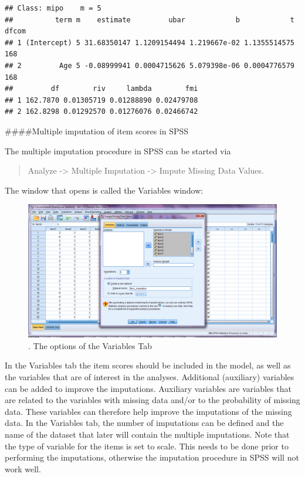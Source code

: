 \documentclass[
]{book}
\begin{document}
\begin{verbatim}
## Class: mipo    m = 5 
##          term m    estimate         ubar            b            t dfcom
## 1 (Intercept) 5 31.68350147 1.1209154494 1.219667e-02 1.1355514575   168
## 2         Age 5 -0.08999941 0.0004715626 5.079398e-06 0.0004776579   168
##         df        riv     lambda        fmi
## 1 162.7870 0.01305719 0.01288890 0.02479708
## 2 162.8298 0.01292570 0.01276076 0.02466742
\end{verbatim}

\#\#\#\#Multiple imputation of item scores in SPSS

The multiple imputation procedure in SPSS can be started via

\begin{quote}
Analyze -\textgreater{} Multiple Imputation -\textgreater{} Impute Missing Data Values.
\end{quote}

The window that opens is called the Variables window:

\begin{figure}

{\centering \includegraphics[width=0.9\linewidth]{images/fig8.1} 

}

\caption{. The options of the Variables Tab}\label{fig:fig8-1}
\end{figure}

In the Variables tab the item scores should be included in the model, as well as the variables that are of interest in the analyses. Additional (auxiliary) variables can be added to improve the imputations. Auxiliary variables are variables that are related to the variables with missing data and/or to the probability of missing data. These variables can therefore help improve the imputations of the missing data. In the Variables tab, the number of imputations can be defined and the name of the dataset that later will contain the multiple imputations.
Note that the type of variable for the items is set to scale. This needs to be done prior to performing the imputations, otherwise the imputation procedure in SPSS will not work well.
\end{document}
